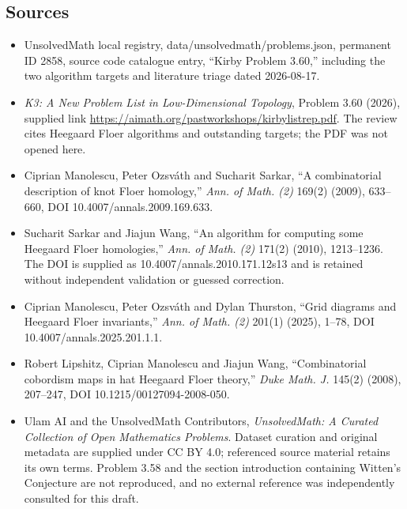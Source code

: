 \documentclass[11pt]{article}
\begin{document}
\subsection{Sources}
\begin{itemize}
\item UnsolvedMath local registry, data/unsolvedmath/problems.json, permanent ID 2858, source code catalogue entry, ``Kirby Problem 3.60,'' including the two algorithm targets and literature triage dated 2026-08-17.
\item \emph{K3: A New Problem List in Low-Dimensional Topology}, Problem 3.60 (2026), supplied link \url{https://aimath.org/pastworkshops/kirbylistrep.pdf}. The review cites Heegaard Floer algorithms and outstanding targets; the PDF was not opened here.
\item [MOS09] Ciprian Manolescu, Peter Ozsváth and Sucharit Sarkar, ``A combinatorial description of knot Floer homology,'' \emph{Ann. of Math. (2)} 169(2) (2009), 633--660, DOI 10.4007/annals.2009.169.633.
\item [SW10] Sucharit Sarkar and Jiajun Wang, ``An algorithm for computing some Heegaard Floer homologies,'' \emph{Ann. of Math. (2)} 171(2) (2010), 1213--1236. The DOI is supplied as 10.4007/annals.2010.171.12s13 and is retained without independent validation or guessed correction.
\item [MOT25] Ciprian Manolescu, Peter Ozsváth and Dylan Thurston, ``Grid diagrams and Heegaard Floer invariants,'' \emph{Ann. of Math. (2)} 201(1) (2025), 1--78, DOI 10.4007/annals.2025.201.1.1.
\item [LMW08] Robert Lipshitz, Ciprian Manolescu and Jiajun Wang, ``Combinatorial cobordism maps in hat Heegaard Floer theory,'' \emph{Duke Math. J.} 145(2) (2008), 207--247, DOI 10.1215/00127094-2008-050.
\item Ulam AI and the UnsolvedMath Contributors, \emph{UnsolvedMath: A Curated Collection of Open Mathematics Problems}. Dataset curation and original metadata are supplied under CC BY 4.0; referenced source material retains its own terms. Problem 3.58 and the section introduction containing Witten's Conjecture are not reproduced, and no external reference was independently consulted for this draft.
\end{itemize}
\end{document}
